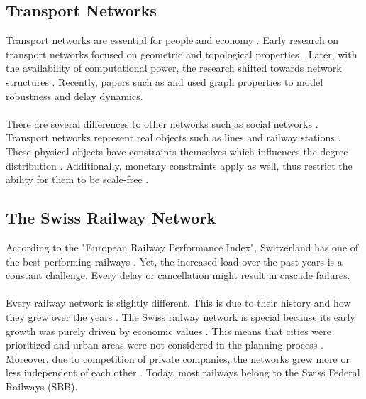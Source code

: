 \documentclass{Resources/netsci-project}
\begin{document}
\subsection{Transport Networks}
Transport networks are essential for people and economy \autocite{GraphSwiss} . Early research on transport networks focused on geometric and topological properties \autocite{GraphSwiss} . Later, with the availability of computational power, the research shifted towards network structures \autocite{GraphSwiss}. Recently, papers such as \textcite{Resilience} and \textcite{ComplexDelay} used graph properties to model robustness and delay dynamics.
\\~\\
There are several differences to other networks such as social networks \autocite{GraphSwiss}. Transport networks represent real objects such as lines and railway stations \autocite{GraphSwiss}. These physical objects have constraints themselves which influences the degree distribution \autocite{GraphSwiss}. Additionally, monetary constraints apply as well, thus restrict the ability for them to be scale-free \autocite{GraphSwiss}.

\subsection{The Swiss Railway Network}
According to the "European Railway Performance Index", Switzerland has one of the best performing railways  \autocite{RailwayPerformanceIndex}. Yet, the increased load over the past years is a constant challenge. Every delay or cancellation might result in cascade failures.
\\~\\
Every railway network is slightly different. This is due to their history and how they grew over the years \autocite{GraphSwiss}. The Swiss railway network is special because its early growth was purely driven by economic values \autocite{GraphSwiss}. This means that cities were prioritized and urban areas were not considered in the planning process \autocite{GraphSwiss}. Moreover, due to competition of private companies, the networks grew more or less independent of each other \autocite{GraphSwiss}. Today, most railways belong to the Swiss Federal Railways (SBB).

\printbibliography
\end{document}
